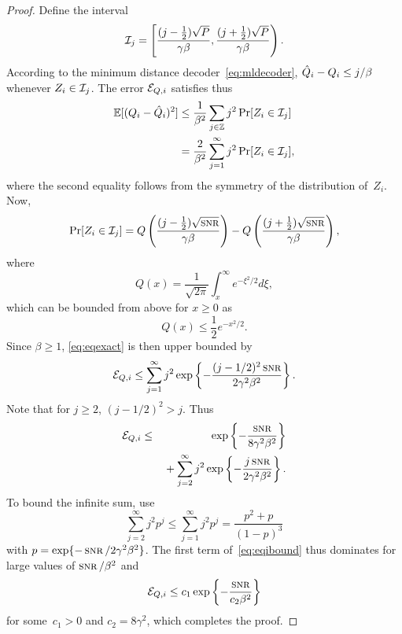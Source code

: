 \begin{proof}
  Define the interval
  \begin{equation*}
    \mathcal{I}_j = \left[ \frac{(j - \frac12) \sqrt{P}}{\gamma\beta},
    \frac{(j + \frac12) \sqrt{P}}{\gamma\beta } \right).
  \end{equation*}
  According to the minimum distance decoder~\eqref{eq:mldecoder}, $\hat{Q}_i - Q_i
  \le j/\beta$ whenever $Z_i \in \mathcal{I}_j$.  The error ${{\mathcal{E}}_{Q,i}}$ satisfies thus
  \begin{align}
    \mathbb{E}[(Q_i - \hat{Q}_i)^2] &\le \frac{1}{\beta^2} \sum_{j \in \mathbb{Z}} j^2 \Pr[Z_i \in
    \mathcal{I}_j]  \nonumber \\
    &= \frac{2}{\beta^2} \sum_{j = 1}^\infty j^2 \Pr[Z_i \in \mathcal{I}_j],
    \label{eq:eqexact}
  \end{align}
  where the second equality follows from the symmetry of the distribution
  of~$Z_i$. Now,
  \begin{equation*}
    \Pr[Z_i \in \I_j] = Q\left( \frac{(j - \frac12) \sqrt{\snr}}{\gamma\beta}
    \right) - Q\left( \frac{(j + \frac12) \sqrt{\snr}}{\gamma\beta } \right),
  \end{equation*}
  where
  \begin{equation*}
    Q(x) = \frac{1}{\sqrt{2\pi}} \int_x^\infty e^{-\xi^2/2} d\xi,
  \end{equation*}
  which can be bounded from above for $x \ge 0$ as
  \begin{equation*}
    Q(x) \le \frac12 e^{-x^2/2}.
  \end{equation*}
  Since $\beta \ge 1$, \eqref{eq:eqexact} is then upper bounded by
  \begin{equation*}
    \Eqi \le \sum_{j=1}^\infty j^2 \exp\left\{ - \frac{(j - 1/2)^2
    \snr}{2\gamma^2\beta^2} \right\}.
  \end{equation*}
  Note that for $j \ge 2$, $(j - 1/2)^2 > j$.  Thus
  \begin{eqnarray}
    \Eqi &\le & \exp \left \{ - \frac{\snr}{8 \gamma^2 \beta^2} \right\}
    \nonumber \\
    & & \mbox{} + 
    \sum_{j = 2}^\infty j^2 \exp \left \{ - \frac{j \snr}{2\gamma^2 \beta^2}
    \right\}. \label{eq:eqibound}
  \end{eqnarray}
  To bound the infinite sum, use 
  \begin{equation}
    \label{eq:geomsum}
    \sum_{j=2}^\infty j^2 p^j \le \sum_{j=1}^\infty j^2 p^j = 
    \frac{p^2+p}{(1-p)^3}
  \end{equation}
  with $p = \exp\{-\snr/2 \gamma^2 \beta^2\}$. The first term
  of~\eqref{eq:eqibound} thus dominates for large values of
  $\snr/\beta^2$ and
  \begin{equation*}
    \Eqi \le c_1\exp\left\{ - \frac{\snr}{c_2 \beta^2} \right\}
  \end{equation*}
  for some~$c_1 > 0$ and $c_2 = 8 \gamma^2$, which completes the proof. 
\end{proof}

